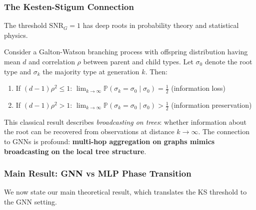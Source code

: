 \subsubsection{The Kesten-Stigum Connection}

The threshold $\mathrm{SNR}_G = 1$ has deep roots in probability theory and statistical physics.

\begin{theorem}
\label{thm:ks_original}
Consider a Galton-Watson branching process with offspring distribution having mean $d$ and correlation $\rho$ between parent and child types. Let $\sigma_0$ denote the root type and $\sigma_k$ the majority type at generation $k$. Then:
\begin{enumerate}
    \item If $(d-1)\rho^2 \leq 1$: $\lim_{k \to \infty} \mathbb{P}(\sigma_k = \sigma_0 \mid \sigma_0) = \frac{1}{2}$ (information loss)
    \item If $(d-1)\rho^2 > 1$: $\lim_{k \to \infty} \mathbb{P}(\sigma_k = \sigma_0 \mid \sigma_0) > \frac{1}{2}$ (information preservation)
\end{enumerate}
\end{theorem}

This classical result describes \textit{broadcasting on trees}: whether information about the root can be recovered from observations at distance $k \to \infty$. The connection to GNNs is profound: \textbf{multi-hop aggregation on graphs mimics broadcasting on the local tree structure}.

\subsubsection{Main Result: GNN vs MLP Phase Transition}

We now state our main theoretical result, which translates the KS threshold to the GNN setting.

